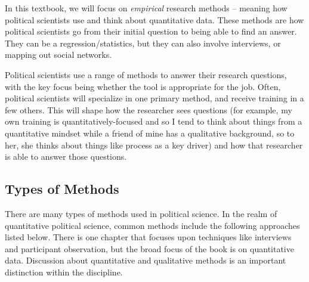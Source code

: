 \documentclass{book}
\begin{document}
In this textbook, we will focus on \emph{empirical} research methods --
meaning how political scientists use and think about quantitative data. These
methods are how political scientists go from their initial question to being
able to find an answer. They can be a regression/statistics, but they can also
involve interviews, or mapping out social networks.

Political scientists use a range of methods to answer their research
questions, with the key focus being whether the tool is appropriate for the
job. Often, political scientists will specialize in one primary method, and
receive training in a few others. This will shape how the researcher sees
questions (for example, my own training is quantitatively-focused and so I
tend to think about things from a quantitative mindset while a friend of mine
has a qualitative background, so to her, she thinks about things like process
as a key driver) and how that researcher is able to answer those questions.

\hypertarget{types-of-methods}{%
\subsection{Types of Methods}\label{types-of-methods}}

There are many types of methods used in political science. In the realm of
quantitative political science, common methods include the following
approaches listed below. There is one chapter that focuses upon techniques
like interviews and participant observation, but the broad focus of the book
is on quantitative data. Discussion about quantitative and qualitative methods
is an important distinction within the discipline.
\end{document}

